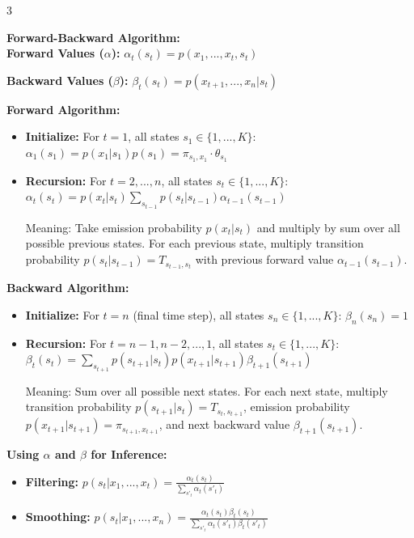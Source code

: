 \documentclass[10pt,landscape]{article}
\begin{document}
\begin{multicols}{3}
\begin{tcolorbox}[breakable, title=Hidden Markov Models, colback=hmm, boxsep=1pt, left=1pt, right=1pt, top=1pt, bottom=1pt]
\textbf{Forward-Backward Algorithm:}\\
\textbf{Forward Values ($\alpha$):}
$\alpha_t(s_t) = p(x_1,...,x_t,s_t)$

\textbf{Backward Values ($\beta$):}
$\beta_t(s_t) = p(x_{t+1},...,x_n|s_t)$

\textbf{Forward Algorithm:}
\begin{itemize}[leftmargin=*,noitemsep,topsep=0pt]
    \item \textbf{Initialize:} For $t=1$, all states $s_1 \in \{1,...,K\}$:
    $\alpha_1(s_1) = p(x_1|s_1)p(s_1) = \pi_{s_1,x_1} \cdot \theta_{s_1}$
    
    \item \textbf{Recursion:} For $t = 2,...,n$, all states $s_t \in \{1,...,K\}$:
    $\alpha_t(s_t) = p(x_t|s_t) \sum_{s_{t-1}} p(s_t|s_{t-1})\alpha_{t-1}(s_{t-1})$
    
    Meaning: Take emission probability $p(x_t|s_t)$ and multiply by sum over all possible previous states. For each previous state, multiply transition probability $p(s_t|s_{t-1}) = T_{s_{t-1},s_t}$ with previous forward value $\alpha_{t-1}(s_{t-1})$.
\end{itemize}

\textbf{Backward Algorithm:}
\begin{itemize}[leftmargin=*,noitemsep,topsep=0pt]
    \item \textbf{Initialize:} For $t=n$ (final time step), all states $s_n \in \{1,...,K\}$:
    $\beta_n(s_n) = 1$
    
    \item \textbf{Recursion:} For $t = n-1, n-2, ..., 1$, all states $s_t \in \{1,...,K\}$:
    $\beta_t(s_t) = \sum_{s_{t+1}} p(s_{t+1}|s_t)p(x_{t+1}|s_{t+1})\beta_{t+1}(s_{t+1})$
    
    Meaning: Sum over all possible next states. For each next state, multiply transition probability $p(s_{t+1}|s_t) = T_{s_t,s_{t+1}}$, emission probability $p(x_{t+1}|s_{t+1}) = \pi_{s_{t+1},x_{t+1}}$, and next backward value $\beta_{t+1}(s_{t+1})$.
\end{itemize}

\textbf{Using $\alpha$ and $\beta$ for Inference:}
\begin{itemize}[leftmargin=*,noitemsep,topsep=0pt]
    \item \textbf{Filtering:} $p(s_t|x_1,...,x_t) = \frac{\alpha_t(s_t)}{\sum_{s'_t} \alpha_t(s'_t)}$
    
    \item \textbf{Smoothing:} $p(s_t|x_1,...,x_n) = \frac{\alpha_t(s_t)\beta_t(s_t)}{\sum_{s'_t} \alpha_t(s'_t)\beta_t(s'_t)}$
    

\end{itemize}
\end{tcolorbox}
\end{multicols}
\end{document}

